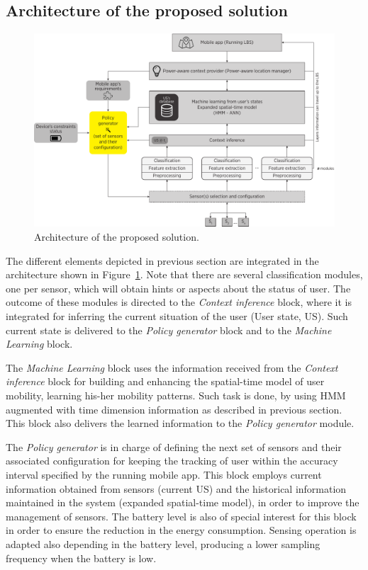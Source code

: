 \documentclass[ENG,PhD]{cinvestav}
\begin{document}
\subsection{Architecture of the proposed solution}
\begin{figure}[t]
  \centering
  \includegraphics[width=\textwidth]{solution-general-overview}
  \caption{Architecture of the proposed solution.}
  \label{fig:solution-architecture}
\end{figure}

The different elements depicted in previous section are integrated in the architecture shown in Figure~\ref{fig:solution-architecture}.
Note that there are several classification modules, one per sensor, which will obtain hints or aspects about the status of user.
The outcome of these modules is directed to the \emph{Context inference} block, where it is integrated for inferring the current situation of the user (User state, US).
Such current state is delivered to the \emph{Policy generator} block and to the \emph{Machine Learning} block.

The \emph{Machine Learning} block uses the information received from the \emph{Context inference} block for building and enhancing the spatial-time model of user mobility, learning his-her mobility patterns.
Such task is done, by using HMM augmented with time dimension information as described in previous section.
This block also delivers the learned information to the \emph{Policy generator} module.

The \emph{Policy generator} is in charge of defining the next set of sensors and their associated configuration for keeping the tracking of user within the accuracy interval specified by the running mobile app.
This block employs current information obtained from sensors (current US) and the historical information maintained in the system (expanded spatial-time model), in order to improve the management of sensors.
The battery level is also of special interest for this block in order to ensure the reduction in the energy consumption.
Sensing operation is adapted also depending in the battery level, producing a lower sampling frequency when the battery is low.
\end{document}
